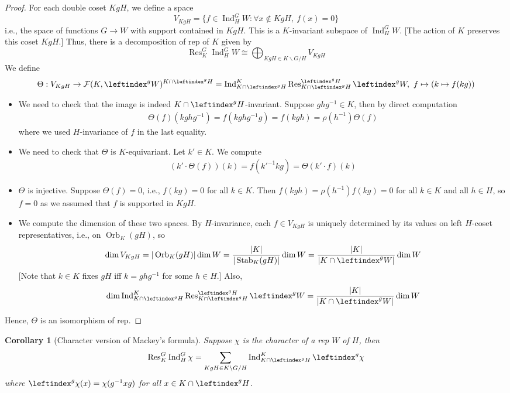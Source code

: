 \documentclass{article}
\theoremstyle{definition}
\theoremstyle{remark}
\theoremstyle{plain}
\newtheorem{crly}[defn]{Corollary}
\newcommand{\Ind}{\operatorname{Ind}}
\newcommand{\Res}{\operatorname{Res}}
\begin{document}
\begin{proof}
    For each double coset $KgH$, we define a space
    \[V_{KgH}=\{f\in\Ind_H^GW:\forall x\not\in KgH,\ f(x)=0\}\]
    i.e., the space of functions $G\to W$ with support contained in $KgH$. This is a $K$-invariant subspace of $\Ind_H^GW$. [The action of $K$ preserves this coset $KgH$.] Thus, there is a decomposition of rep of $K$ given by
    \[\Res^G_K\Ind_H^G W\cong\bigoplus_{KgH\in K\backslash G/H}V_{KgH}\]
    We define $$\Theta: V_{KgH}\to\mathcal{F}(K,\leftindex^gW)^{K\cap\leftindex^gH}=\Ind_{K\cap\leftindex^gH}^K\Res^{\leftindex^gH}_{K\cap\leftindex^gH}\leftindex^gW,\ f\mapsto(k\mapsto f(kg))$$
    \begin{itemize}
        \item We need to check that the image is indeed $K\cap\leftindex^gH$-invariant. Suppose $ghg^{-1}\in K$, then by direct computation
        \begin{align*}
            \Theta(f)(kghg^{-1})=f(kghg^{-1}g)=f(kgh)=\rho(h^{-1})\Theta(f)
        \end{align*}
        where we used $H$-invariance of $f$ in the last equality.
        \item We need to check that $\Theta$ is $K$-equivariant. Let $k'\in K$. We compute
        \begin{align*}
            (k'\cdot \Theta(f))(k)=f(k'^{-1}kg)=\Theta(k'\cdot f)(k)
        \end{align*}
        \item $\Theta$ is injective. Suppose $\Theta(f)=0$, i.e., $f(kg)=0$ for all $k\in K$. Then $f(kgh)=\rho(h^{-1})f(kg)=0$ for all $k\in K$ and all $h\in H$, so $f=0$ as we assumed that $f$ is supported in $KgH$.
        \item We compute the dimension of these two spaces. By $H$-invariance, each $f\in V_{KgH}$ is uniquely determined by its values on left $H$-coset representatives, i.e., on $\operatorname{Orb}_{K}(gH)$, so 
        \[\dim V_{KgH}=|\operatorname{Orb}_K(gH)|\dim W=\dfrac{|K|}{|\operatorname{Stab}_K(gH)|}\dim W=\dfrac{|K|}{|K\cap\leftindex^gW|}\dim W\]
        [Note that $k\in K$ fixes $gH$ iff $k=ghg^{-1}$ for some $h\in H$.]
        Also,
        \[\dim\Ind_{K\cap\leftindex^gH}^K\Res^{\leftindex^gH}_{K\cap\leftindex^gH}\leftindex^gW=\dfrac{|K|}{|K\cap\leftindex^gW|}\dim W\]
    \end{itemize} 
    Hence, $\Theta$ is an isomorphism of rep.
\end{proof}
\begin{crly}[Character version of Mackey's formula]
Suppose $\chi$ is the character of a rep $W$ of $H$, then 
    \[\Res^G_K\Ind_H^G\chi=\sum_{KgH\in K\backslash G/H}\Ind_{K\cap\leftindex^gH}^K\leftindex^g\chi\]
    where $\leftindex^g\chi(x)=\chi(g^{-1}xg)$ for all $x\in K\cap\leftindex^gH$.
\end{crly}
\end{document}
